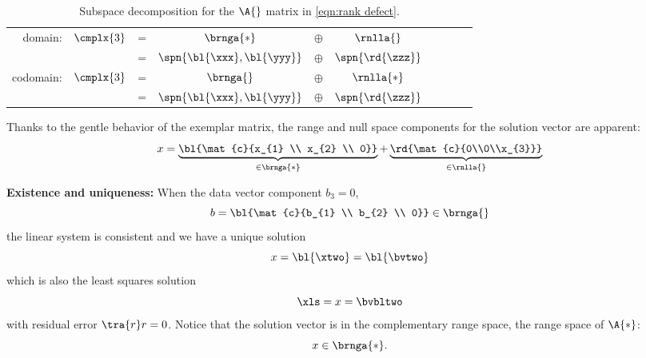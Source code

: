     \begin{table}[h!]
    	\caption[Subspace decomposition for \eqref{eqn:rank defect}]{Subspace decomposition for the $\A{}$ matrix in \eqref{eqn:rank defect}.}
    	\begin{center}
    		\begin{tabular}{rccccccccc}
    		  domain:   & $\cmplx{3}$ & = & $\brnga{*}$ & $\oplus$ & $\rnlla{}$ \\
		                             && = & $\spn{\bl{\xxx},\bl{\yyy}}$ & $\oplus$ & $\spn{\rd{\zzz}}$ \\[19pt]
    		  codomain: & $\cmplx{3}$ & = & $\brnga{}$ & $\oplus$ & $\rnlla{*}$ \\
		                             && = & $\spn{\bl{\xxx},\bl{\yyy}}$ & $\oplus$ & $\spn{\rd{\zzz}}$
    		\end{tabular}
    	\end{center}
    \end{table}%

Thanks to the gentle behavior of the exemplar matrix, the range and null space components for the solution vector are apparent:
  \begin{equation}
      x = \underbrace{\bl{\mat{c}{x_{1} \\ x_{2} \\ 0}}}_{\in\brnga{*}} + \underbrace{\rd{\mat{c}{0\\0\\x_{3}}}}_{\in\rnlla{}}
  \end{equation}

{\bf{Existence and uniqueness:}}
When the data vector component $b_{3} = 0$, 
  \begin{equation}
      b = \bl{\mat{c}{b_{1} \\ b_{2} \\ 0}} \in \brnga{}
  \end{equation}
the linear system is consistent and we have a unique solution 
  \begin{equation}
    x = \bl{\xtwo} = \bl{\bvtwo}
  \end{equation}
which is also the least squares solution
  \begin{equation}
    \xls = x = \bvbltwo
  \end{equation}
with residual error $\tra{r}r = 0$. Notice that the solution vector is in the complementary range space, the range space of $\A{*}$:
  \begin{equation}
      x \in \brnga{*}.
  \end{equation}

